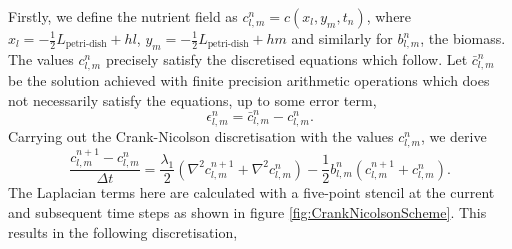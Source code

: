 Firstly, we 
define the nutrient field as $c_{l,m}^{n} = c(x_l, y_m, t_n)$, where $x_l = -\frac{1}{2}L_{\textrm{petri-dish}} + h l$, 
$y_m = -\frac{1}{2}L_{\textrm{petri-dish}} + h m$ and similarly for $b_{l,m}^{n}$,
the biomass. The values  $c_{l,m}^{n}$ precisely satisfy the discretised equations which follow.
Let  $\bar{c}_{l,m}^{n}$ be the solution achieved with finite precision arithmetic 
operations which does not necessarily satisfy the equations, up to some error term,
\begin{equation*}
    \epsilon_{l,m}^n = \bar{c}_{l,m}^{n} - c_{l,m}^{n}.
\end{equation*}
Carrying out the Crank-Nicolson discretisation with the values $c_{l,m}^{n}$, we derive
\begin{equation*}
    \frac{c_{l,m}^{n+1} - c_{l,m}^{n}}{\Delta t} =
    \frac{\lambda_1}{2} \left( \nabla^2 c_{l,m}^{n+1} + \nabla^2 c_{l,m}^{n} \right) -
     \frac{1}{2} b_{l,m}^{n} (c_{l,m}^{n+1} + c_{l,m}^{n}).
\end{equation*}
The Laplacian terms here are calculated with a five-point stencil at the current and subsequent 
time steps as shown in figure \ref{fig:CrankNicolsonScheme}. This results in the following discretisation,

